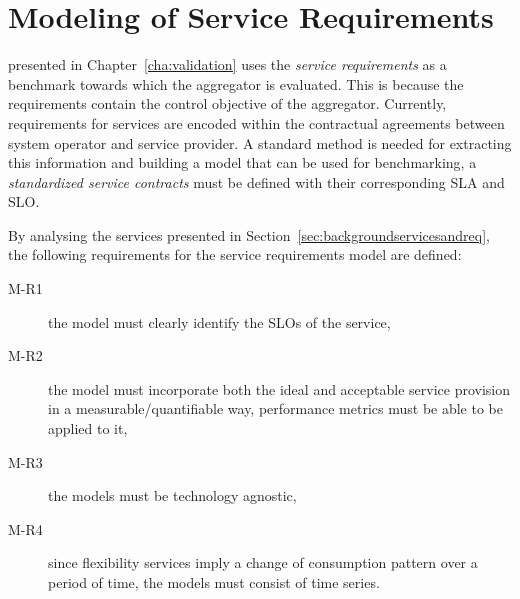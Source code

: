 \section{Modeling of Service Requirements} %
\label{sec:modelingAS}
 presented in Chapter~\ref{cha:validation} uses the \emph{service requirements} as a benchmark towards which the aggregator is evaluated. This is because the requirements contain the control objective of the aggregator. Currently, requirements for services are encoded within the contractual agreements between system operator and service provider. A standard method is needed for extracting this information and building a model that can be used for benchmarking, \ie a \emph{standardized service contracts} must be defined with their corresponding SLA and SLO.

By analysing the services presented in Section~\ref{sec:backgroundservicesandreq}, the following requirements for the service requirements model are defined:
\begin{description}
    \item[M-R1] the model must clearly identify the SLOs of the service,
    \item[M-R2] the model must incorporate both the ideal and acceptable service provision in a measurable/quantifiable way, \ie performance metrics must be able to be applied to it,
    \item[M-R3] the models must be technology agnostic,
    \item[M-R4] since flexibility services imply a change of consumption pattern over a period of time, the models must consist of time series.
\end{description}

